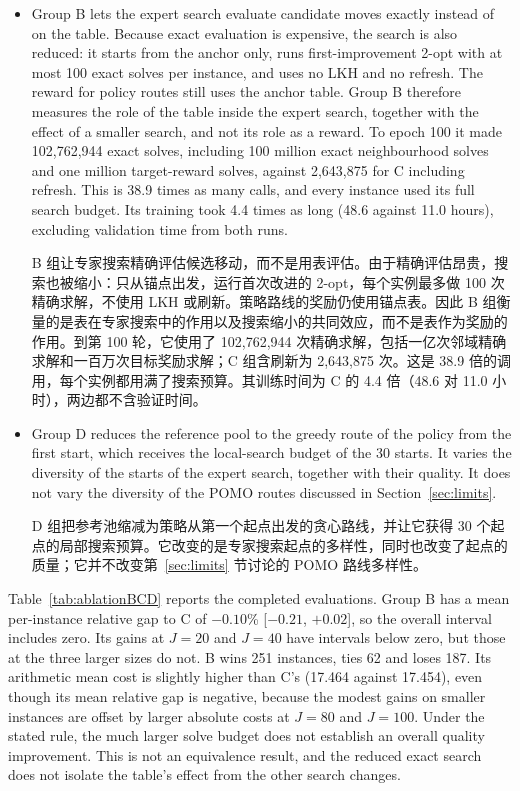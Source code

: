\documentclass[preprint,12pt,authoryear]{elsarticle}
\newcommand{\zhitem}[1]{\par{\color{zhc}#1}}
\begin{document}
\begin{itemize}
\item Group B lets the expert search evaluate candidate moves exactly instead of on the table. Because exact evaluation is expensive, the search is also reduced: it starts from the anchor only, runs first-improvement 2-opt with at most 100 exact solves per instance, and uses no LKH and no refresh. The reward for policy routes still uses the anchor table. Group B therefore measures the role of the table inside the expert search, together with the effect of a smaller search, and not its role as a reward. To epoch 100 it made 102,762,944 exact solves, including 100 million exact neighbourhood solves and one million target-reward solves, against 2,643,875 for C including refresh. This is 38.9 times as many calls, and every instance used its full search budget. Its training took 4.4 times as long (48.6 against 11.0 hours), excluding validation time from both runs. \zhitem{B 组让专家搜索精确评估候选移动，而不是用表评估。由于精确评估昂贵，搜索也被缩小：只从锚点出发，运行首次改进的 2-opt，每个实例最多做 100 次精确求解，不使用 LKH 或刷新。策略路线的奖励仍使用锚点表。因此 B 组衡量的是表在专家搜索中的作用以及搜索缩小的共同效应，而不是表作为奖励的作用。到第 100 轮，它使用了 102,762,944 次精确求解，包括一亿次邻域精确求解和一百万次目标奖励求解；C 组含刷新为 2,643,875 次。这是 38.9 倍的调用，每个实例都用满了搜索预算。其训练时间为 C 的 4.4 倍（48.6 对 11.0 小时），两边都不含验证时间。}
\item Group D reduces the reference pool to the greedy route of the policy from the first start, which receives the local-search budget of the 30 starts. It varies the diversity of the starts of the expert search, together with their quality. It does not vary the diversity of the POMO routes discussed in Section~\ref{sec:limits}. \zhitem{D 组把参考池缩减为策略从第一个起点出发的贪心路线，并让它获得 30 个起点的局部搜索预算。它改变的是专家搜索起点的多样性，同时也改变了起点的质量；它并不改变第~\ref{sec:limits} 节讨论的 POMO 路线多样性。}
\end{itemize}

Table~\ref{tab:ablationBCD} reports the completed evaluations. Group B has a mean per-instance relative gap to C of $-0.10$\% [$-0.21$, $+0.02$], so the overall interval includes zero. Its gains at $J = 20$ and $J = 40$ have intervals below zero, but those at the three larger sizes do not. B wins 251 instances, ties 62 and loses 187. Its arithmetic mean cost is slightly higher than C's (17.464 against 17.454), even though its mean relative gap is negative, because the modest gains on smaller instances are offset by larger absolute costs at $J = 80$ and $J = 100$. Under the stated rule, the much larger solve budget does not establish an overall quality improvement. This is not an equivalence result, and the reduced exact search does not isolate the table's effect from the other search changes.
\end{document}
